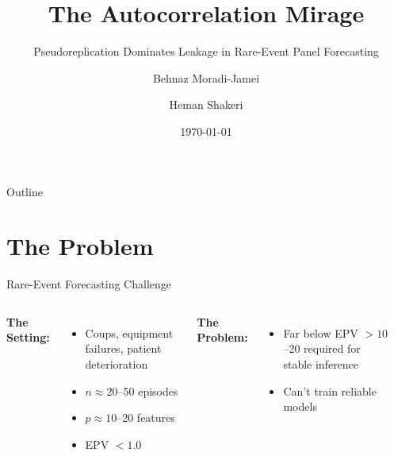 \documentclass[aspectratio=169]{beamer}
\title{The Autocorrelation Mirage}
\subtitle{Pseudoreplication Dominates Leakage in Rare-Event Panel Forecasting}
\author{Behnaz Moradi-Jamei \and Heman Shakeri}
\institute{James Madison University \and University of Virginia}
\date{\today}
\begin{document}
\begin{frame}
\titlepage
\end{frame}

\begin{frame}{Outline}
\tableofcontents
\end{frame}

\section{The Problem}

\begin{frame}{Rare-Event Forecasting Challenge}
\begin{columns}[T]
\textbf{The Setting:}
\begin{itemize}
\item Coups, equipment failures, patient deterioration
\item $n \approx 20$--50 episodes
\item $p \approx 10$--20 features
\item \alert{EPV $< 1.0$}
\end{itemize}

\vspace{1em}
\textbf{The Problem:}
\begin{itemize}
\item Far below EPV $> 10$--20 required for stable inference
\item Can't train reliable models
\end{itemize}

\begin{center}
\end{center}
\end{columns}
\end{frame}
\end{document}
